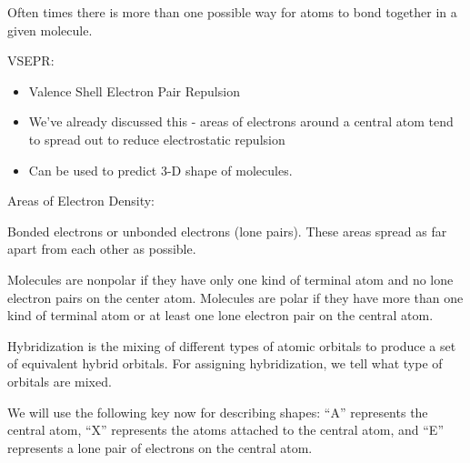 \documentclass[../hchem.tex]{subfiles}
\begin{document}
Often times there is more than one possible way for atoms to bond together in a given molecule.

VSEPR:
\begin{itemize}
    \item Valence Shell Electron Pair Repulsion 
    \item We've already discussed this - areas of electrons around a central atom tend to spread out to reduce electrostatic repulsion 
    \item Can be used to predict 3-D shape of molecules.
\end{itemize}

Areas of Electron Density:

Bonded electrons or unbonded electrons (lone pairs). These areas spread as far apart from each other as possible.

Molecules are nonpolar if they have only one kind of terminal atom and no lone electron pairs on the center atom. Molecules 
are polar if they have more than one kind of terminal atom or at least one lone electron pair on the central atom.

Hybridization is the mixing of different types of atomic orbitals to produce a set of equivalent hybrid orbitals. For assigning hybridization, we tell what type of orbitals are mixed.

We will use the following key now for describing shapes: ``A'' represents the central atom, ``X'' represents the atoms attached to the central atom, and ``E'' represents a lone pair of electrons on the central atom.
\end{document}
